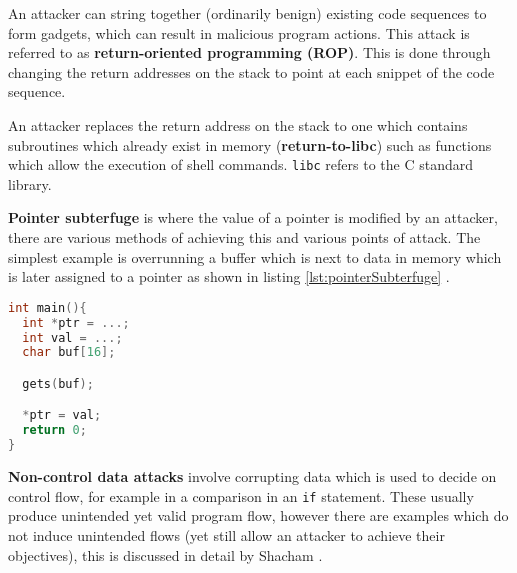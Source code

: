 An attacker can string together (ordinarily benign) existing code sequences to form gadgets, which can result in malicious program actions. This attack is referred to as \textbf{return-oriented programming (ROP)}. This is done through changing the return addresses on the stack to point at each snippet of the code sequence.

An attacker replaces the return address on the stack to one which contains subroutines which already exist in memory (\textbf{return-to-libc}) such as functions which allow the execution of shell commands. \verb|libc| refers to the C standard library.

\textbf{Pointer subterfuge} is where the value of a pointer is modified by an attacker, there are various methods of achieving this and various points of attack. The simplest example is overrunning a buffer which is next to data in memory which is later assigned to a pointer as shown in listing \ref{lst:pointerSubterfuge} \cite{Wang2016a}.

\begin{lstlisting}[language={C},caption={An example of code which is vulnerable to pointer subterfuge \cite{Wang2016a}},label={lst:pointerSubterfuge}]
int main(){
  int *ptr = ...;
  int val = ...;
  char buf[16];

  gets(buf);

  *ptr = val;
  return 0;
}
\end{lstlisting}


\textbf{Non-control data attacks} involve corrupting data which is used to decide on control flow, for example in a comparison in an \verb|if| statement. These usually produce unintended yet valid program flow, however there are examples which do not induce unintended flows (yet still allow an attacker to achieve their objectives), this is discussed in detail by Shacham \cite{Shacham2007}.